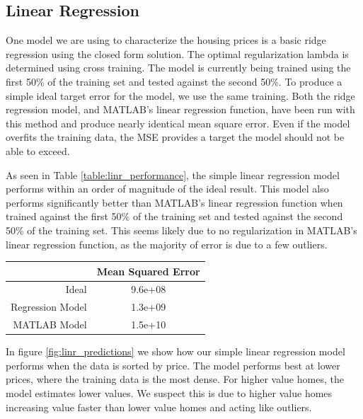 \documentclass[letter,10pt]{article}
\begin{document}
	\begin{multicols}{2}
		\subsection{Linear Regression}
			One model we are using to characterize the housing prices is a basic ridge regression using the closed form solution. The optimal regularization lambda is determined using cross training. The model is currently being trained using the first 50\% of the training set and tested against the second 50\%. To produce a simple ideal target error for the model, we use the same training. Both the ridge regression model, and MATLAB's linear regression function, have been run with this method and produce nearly identical mean square error. Even if the model overfits the training data, the MSE provides a target the model should not be able to exceed.
		\par
			As seen in Table \ref{table:linr_performance}, the simple linear regression model performs within an order of magnitude of the ideal result. This model also performs significantly better than MATLAB's linear regression function when trained against the first 50\% of the training set and tested against the second 50\% of the training set. This seems likely due to no regularization in MATLAB's linear regression function, as the majority of error is due to a few outliers.
		\par
			\begin{tabular}{r|c}
				& \small{Mean Squared Error} \\
				\hline
				\small{Ideal} & \small{9.6e+08} \\
				\hline
				\small{Regression Model} & \small{1.3e+09} \\
				\hline
				\small{MATLAB Model} & \small{1.5e+10} \\
				\hline
			\end{tabular}
			\label{table:linr_performance}
		\par
			In figure \ref{fig:linr_predictions} we show how our simple linear regression model performs when the data is sorted by price. The model performs best at lower prices, where the training data is the most dense. For higher value homes, the model estimates lower values. We suspect this is due to higher value homes increasing value faster than lower value homes and acting like outliers.
		\par
		\begin{center}

\end{center}
\end{multicols}
\end{document}

